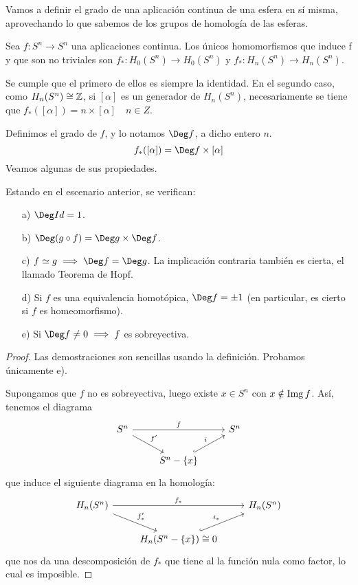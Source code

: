 Vamos a definir el grado de una aplicación continua de una esfera en sí misma, aprovechando lo que sabemos
de los grupos de homología de las esferas.

Sea $f \colon S^n \to S^n$ una aplicaciones continua. Los únicos homomorfismos que induce f y que son no triviales son
$f_* \colon H_0(S^n) \to H_0(S^n)$ y $f_* \colon H_n(S^n) \to H_n(S^n)$.

Se cumple que el primero de ellos es siempre la identidad. En el segundo caso, como $H_n(S^n) \cong \mathbb{Z}$, si $[\alpha]$ es un
generador de $H_n(S^n)$, necesariamente se tiene que $f_*([\alpha]) = n \times [\alpha] \quad n \in Z$.

Definimos el grado de $f$, y lo notamos $\Deg f$, a dicho entero $n$.
\[ f_*([\alpha]) = \Deg f \times [\alpha] \]
Veamos algunas de sus propiedades.

\begin{proposition}[Propiedades]
  Estando en el escenario anterior, se verifican:
  \begin{itemize}
    \item[a)] $\Deg Id = 1$.
    \item[b)] $\Deg (g \circ f) = \Deg g \times \Deg f$.
    \item[c)] $f \simeq g \implies \Deg f = \Deg g$. La implicación contraria también es cierta, el llamado Teorema de Hopf.
    \item[d)] Si $f$ es una equivalencia homotópica, $\Deg f = \pm 1$ (en particular, es cierto si $f$ es homeomorfismo).
    \item[e)] Si $\Deg f \neq 0 \implies f$ es sobreyectiva.
  \end{itemize}
\end{proposition}

\begin{proof}
  Las demostraciones son sencillas usando la definición. Probamos únicamente e).

  Supongamos que $f$ no es sobreyectiva, luego existe $x \in S^n$ con $x \notin \operatorname{Img} f$. Así, tenemos el diagrama
  \[ \begin{tikzcd}
    S^n  \arrow{dr}{f'} \arrow{rr}{f} & & S^n  \\
    & S^n - \{x\} \arrow[hookrightarrow]{ur}{i}
  \end{tikzcd} \]
  que induce el siguiente diagrama en la homología:
  \[ \begin{tikzcd}
    H_n(S^n)  \arrow{dr}{f'_*} \arrow{rr}{f_*} & & H_n(S^n)  \\
    & H_n(S^n - \{x\}) \cong 0 \arrow[hookrightarrow]{ur}{i_*}
  \end{tikzcd} \]
  que nos da una descomposición de $f_*$ que tiene al la función nula como factor, lo cual es imposible.
\end{proof}
